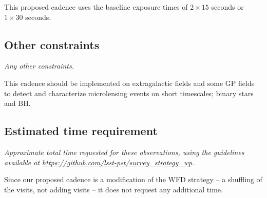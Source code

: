 \documentclass[11pt]{article}
\begin{document}
This proposed cadence uses the baseline exposure times of $2\times15$ seconds or $1\times30$ seconds.

\subsection{Other constraints}
\begin{footnotesize}
{\it Any other constraints.}
\end{footnotesize}
This cadence should be implemented on extragalactic fields and some GP fields to detect and characterize microlensing events on short timescales; binary stars and BH.


\subsection{Estimated time requirement}
\begin{footnotesize}
{\it Approximate total time requested for these observations, using the guidelines available at \url{https://github.com/lsst-pst/survey_strategy_wp}.}
\end{footnotesize}

Since our proposed cadence is a modification of the WFD strategy -- a shuffling of the visits, not adding visits -- it does not request any additional time.

\vspace{.3in}
\end{document}
